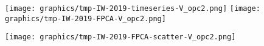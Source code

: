 
\begin{center}
\begin{minipage}{7.0in}
\texttt{[image: graphics/tmp-IW-2019-timeseries-V\_opc2.png]}
\quad
\texttt{[image: graphics/tmp-IW-2019-FPCA-V\_opc2.png]}
\vskip 1.0cm
\begin{center}
\texttt{[image: graphics/tmp-IW-2019-FPCA-scatter-V\_opc2.png]}
\end{center}
\end{minipage}
\end{center}


\renewcommand{\theenumi}{\roman{enumi}}
\renewcommand{\labelenumi}{\textnormal{(\theenumi)}$\;\;$}

